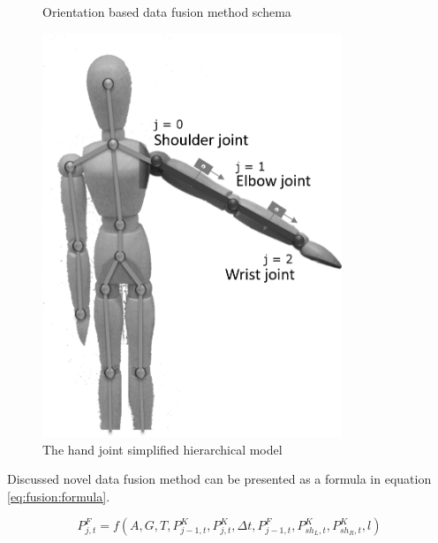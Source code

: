 \documentclass[sensors,article,submit,moreauthors,pdftex,10pt,a4paper]{mdpi}
\begin{document}
	\begin{minipage}{\linewidth}
      \centering
      \begin{minipage}[b]{0.45\linewidth}
          \begin{figure}[H]
            	\scalebox{0.5}{
				
			}
			\caption{Orientation based data fusion method schema}
			\label{fig:methodPhases}
          \end{figure}
      \end{minipage}
      	\hfill
      \begin{minipage}[b]{0.45\linewidth}
          \begin{figure}[H]
            \includegraphics[width=0.8\textwidth]{Figure11.png}
			\caption{The hand joint simplified hierarchical model}		
			\label{fig:hybrid:jointsHierarchy}	
          \end{figure}
      \end{minipage}
  \end{minipage}
	
	Discussed novel data fusion method can be presented as a formula in equation \ref{eq:fusion:formula}.
	
	\begin{equation}
		P^F_{j,t} = f(A,G,T,P_{j-1,t}^K,P_{j,t}^K,\Delta t, P^F_{j-1,t}, P^K_{sh_L,t},P^K_{sh_R,t},l) 
		\label{eq:fusion:formula}
	\end{equation}
	
\end{document}
